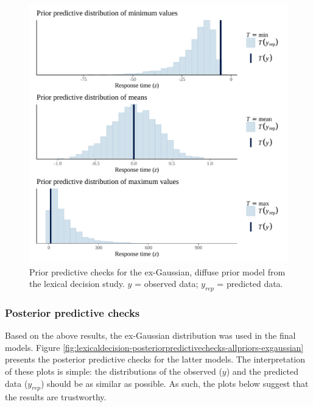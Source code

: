 \documentclass[
  12pt,
  man,floatsintext]{apa7}
\begin{document}
\begin{figure}

{\centering \includegraphics[width=0.8\linewidth]{../lexicaldecision/bayesian_analysis/prior_predictive_checks/plots/lexicaldecision_priorpredictivecheck_diffusepriors_exgaussian} 

}

\caption{Prior predictive checks for the ex-Gaussian, diffuse prior model from the lexical decision study. \(y\) = observed data; \(y_{rep}\) = predicted data.}\label{fig:lexicaldecision-priorpredictivecheck-diffusepriors-exgaussian}
\end{figure}

\hypertarget{posterior-predictive-checks-2}{%
\subsubsection{Posterior predictive checks}\label{posterior-predictive-checks-2}}

Based on the above results, the ex-Gaussian distribution was used in the final models. Figure \ref{fig:lexicaldecision-posteriorpredictivechecks-allpriors-exgaussian} presents the posterior predictive checks for the latter models. The interpretation of these plots is simple: the distributions of the observed (\(y\)) and the predicted data (\(y_{rep}\)) should be as similar as possible. As such, the plots below suggest that the results are trustworthy.
\end{document}
